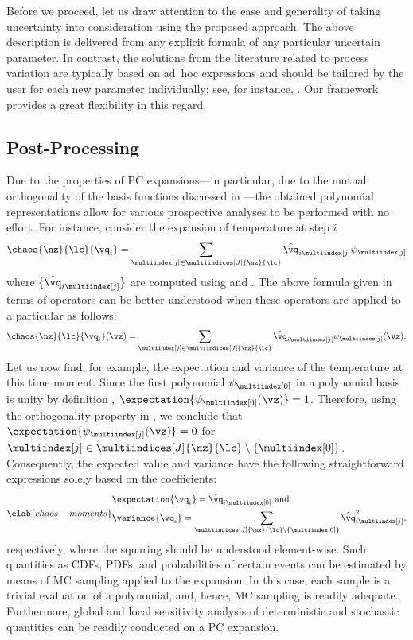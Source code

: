Before we proceed, let us draw attention to the ease and generality of taking
uncertainty into consideration using the proposed approach. The above
description is delivered from any explicit formula of any particular uncertain
parameter. In contrast, the solutions from the literature related to process
variation are typically based on ad~hoc expressions and should be tailored by
the user for each new parameter individually; see, for instance,
\cite{ghanta2006, bhardwaj2008, huang2009a}. Our framework provides a great
flexibility in this regard.

\subsection{Post-Processing}

Due to the properties of \ac{PC} expansions---in particular, due to the mutual
orthogonality of the basis functions discussed in ---the
obtained polynomial representations allow for various prospective analyses to be
performed with no effort. For instance, consider the expansion of temperature at
step $i$
\[
  \chaos{\nz}{\lc}{\vq_i} = \sum_{\multiindex[j] \in \multiindices[J]{\nz}{\lc}} \hat{\vq}_{i \multiindex[j]} \psi_{\multiindex[j]}
\]
where $\{ \hat{\vq}_{i \multiindex[j]} \}$ are computed using
 and . The above formula
given in terms of operators can be better understood when these operators are
applied to a particular \vz as follows:
\[
  \chaos{\nz}{\lc}{\vq_i}(\vz) = \sum_{\multiindex[j] \in \multiindices[J]{\nz}{\lc}} \hat{\vq}_{i \multiindex[j]} \psi_{\multiindex[j]}(\vz).
\]
Let us now find, for example, the expectation and variance of the temperature at
this time moment. Since the first polynomial $\psi_{\multiindex[0]}$ in a
polynomial basis is unity by definition \cite{xiu2010},
$\expectation{\psi_{\multiindex[0]}(\vz)} = 1$. Therefore, using the
orthogonality property in , we conclude that
$\expectation{\psi_{\multiindex[j]}(\vz)} = 0$ for $\multiindex[j] \in
\multiindices[J]{\nz}{\lc} \setminus \{ \multiindex[0] \}$. Consequently, the
expected value and variance have the following straightforward expressions
solely based on the coefficients:
\begin{equation} \elab{chaos-moments}
  \begin{split}
    & \expectation{\vq_i} = \hat{\vq}_{i \multiindex[0]} \text{ and} \\
    & \variance{\vq_i} = \sum_{\multiindices[J]{\nz}{\lc} \setminus \{ \multiindex[0] \}} \hat{\vq}_{i \multiindex[j]}^2,
  \end{split}
\end{equation}
respectively, where the squaring should be understood element-wise. Such
quantities as \acp{CDF}, \acp{PDF}, and probabilities of certain events can be
estimated by means of \ac{MC} sampling applied to the expansion. In this case,
each sample is a trivial evaluation of a polynomial, and, hence, \ac{MC}
sampling is readily adequate. Furthermore, global and local sensitivity analysis
of deterministic and stochastic quantities can be readily conducted on a \ac{PC}
expansion.
